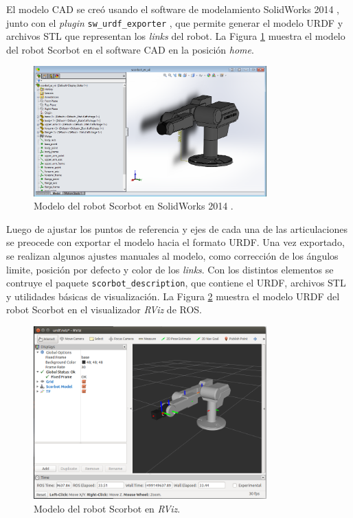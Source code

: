 El modelo CAD se creó usando el software de modelamiento SolidWorks 2014 \textregistered, junto con el \textit{plugin} \texttt{sw\_urdf\_exporter} \cite{sw_urdf}, que permite generar el modelo URDF y archivos STL que representan los \textit{links} del robot. La Figura \ref{cap4_scorbot_cad} muestra el modelo del robot Scorbot en el software CAD en la posición \textit{home}.

\begin{figure}[H]
  \centering
  \includegraphics[width=0.8\textwidth]{img/cap4/cad_solidworks.PNG}
  \caption{Modelo del robot Scorbot en SolidWorks 2014 \textregistered.}
  \label{cap4_scorbot_cad}
\end{figure}

Luego de ajustar los puntos de referencia y ejes de cada una de las articulaciones se preocede con exportar el modelo hacia el formato URDF. Una vez exportado, se realizan algunos ajustes manuales al modelo, como corrección de los ángulos limite, posición por defecto y color de los \textit{links}. Con los distintos elementos se contruye el paquete \texttt{scorbot\_description}, que contiene el URDF, archivos STL y utilidades básicas de visualización. La Figura \ref{cap4_scorbot_rviz} muestra el modelo URDF del robot Scorbot en el visualizador \textit{RViz} de ROS.

\begin{figure}[H]
  \centering
  \includegraphics[width=0.8\textwidth]{img/cap4/scorbot_rviz.png}
  \caption{Modelo del robot Scorbot en \textit{RViz}.}
  \label{cap4_scorbot_rviz}
\end{figure}

